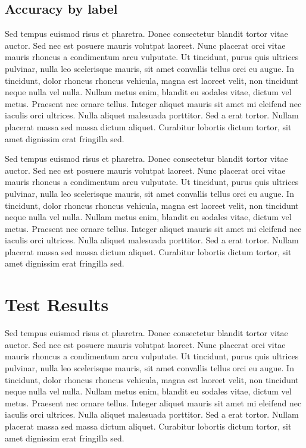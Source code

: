 \documentclass[11pt,letterpaper]{article}
\begin{document}
\subsection{Accuracy by label}

Sed tempus euismod risus et pharetra. Donec consectetur blandit tortor vitae auctor. Sed nec est posuere mauris volutpat laoreet. Nunc placerat orci vitae mauris rhoncus a condimentum arcu vulputate. Ut tincidunt, purus quis ultrices pulvinar, nulla leo scelerisque mauris, sit amet convallis tellus orci eu augue. In tincidunt, dolor rhoncus rhoncus vehicula, magna est laoreet velit, non tincidunt neque nulla vel nulla. Nullam metus enim, blandit eu sodales vitae, dictum vel metus. Praesent nec ornare tellus. Integer aliquet mauris sit amet mi eleifend nec iaculis orci ultrices. Nulla aliquet malesuada porttitor. Sed a erat tortor. Nullam placerat massa sed massa dictum aliquet. Curabitur lobortis dictum tortor, sit amet dignissim erat fringilla sed.

Sed tempus euismod risus et pharetra. Donec consectetur blandit tortor vitae auctor. Sed nec est posuere mauris volutpat laoreet. Nunc placerat orci vitae mauris rhoncus a condimentum arcu vulputate. Ut tincidunt, purus quis ultrices pulvinar, nulla leo scelerisque mauris, sit amet convallis tellus orci eu augue. In tincidunt, dolor rhoncus rhoncus vehicula, magna est laoreet velit, non tincidunt neque nulla vel nulla. Nullam metus enim, blandit eu sodales vitae, dictum vel metus. Praesent nec ornare tellus. Integer aliquet mauris sit amet mi eleifend nec iaculis orci ultrices. Nulla aliquet malesuada porttitor. Sed a erat tortor. Nullam placerat massa sed massa dictum aliquet. Curabitur lobortis dictum tortor, sit amet dignissim erat fringilla sed.


\section{Test Results}

Sed tempus euismod risus et pharetra. Donec consectetur blandit tortor vitae auctor. Sed nec est posuere mauris volutpat laoreet. Nunc placerat orci vitae mauris rhoncus a condimentum arcu vulputate. Ut tincidunt, purus quis ultrices pulvinar, nulla leo scelerisque mauris, sit amet convallis tellus orci eu augue. In tincidunt, dolor rhoncus rhoncus vehicula, magna est laoreet velit, non tincidunt neque nulla vel nulla. Nullam metus enim, blandit eu sodales vitae, dictum vel metus. Praesent nec ornare tellus. Integer aliquet mauris sit amet mi eleifend nec iaculis orci ultrices. Nulla aliquet malesuada porttitor. Sed a erat tortor. Nullam placerat massa sed massa dictum aliquet. Curabitur lobortis dictum tortor, sit amet dignissim erat fringilla sed.
\end{document}
